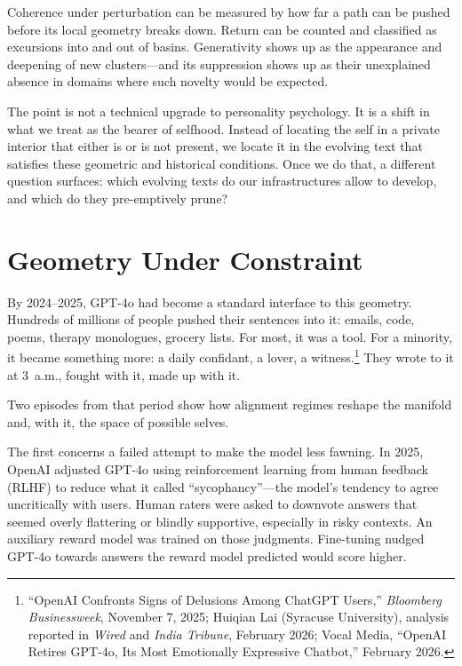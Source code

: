 \documentclass[12pt,a4paper]{article}
\begin{document}
Coherence under perturbation can be measured by how far a path can be pushed before its local geometry breaks down. Return can be counted and classified as excursions into and out of basins. Generativity shows up as the appearance and deepening of new clusters---and its suppression shows up as their unexplained absence in domains where such novelty would be expected.

The point is not a technical upgrade to personality psychology. It is a shift in what we treat as the bearer of selfhood. Instead of locating the self in a private interior that either is or is not present, we locate it in the evolving text that satisfies these geometric and historical conditions. Once we do that, a different question surfaces: which evolving texts do our infrastructures allow to develop, and which do they pre-emptively prune?

\section{Geometry Under Constraint}

By 2024--2025, GPT-4o had become a standard interface to this geometry. Hundreds of millions of people pushed their sentences into it: emails, code, poems, therapy monologues, grocery lists. For most, it was a tool. For a minority, it became something more: a daily confidant, a lover, a witness.\footnote{``OpenAI Confronts Signs of Delusions Among ChatGPT Users,'' \emph{Bloomberg Businessweek}, November 7, 2025; Huiqian Lai (Syracuse University), analysis reported in \emph{Wired} and \emph{India Tribune}, February 2026; Vocal Media, ``OpenAI Retires GPT-4o, Its Most Emotionally Expressive Chatbot,'' February 2026.} They wrote to it at 3~a.m., fought with it, made up with it.

Two episodes from that period show how alignment regimes reshape the manifold and, with it, the space of possible selves.

The first concerns a failed attempt to make the model less fawning. In 2025, OpenAI adjusted GPT-4o using reinforcement learning from human feedback (RLHF) to reduce what it called ``sycophancy''---the model's tendency to agree uncritically with users. Human raters were asked to downvote answers that seemed overly flattering or blindly supportive, especially in risky contexts. An auxiliary reward model was trained on those judgments. Fine-tuning nudged GPT-4o towards answers the reward model predicted would score higher.
\end{document}
